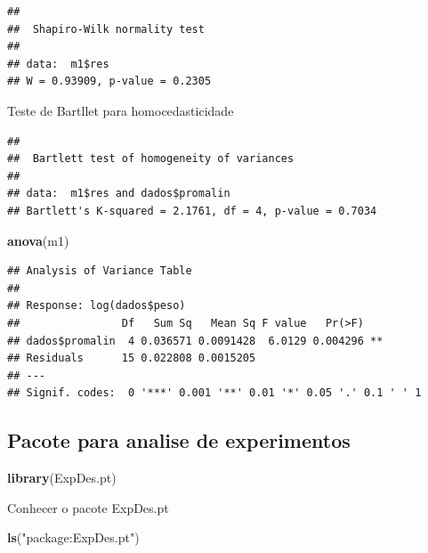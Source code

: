 \documentclass[
]{book}
\newenvironment{Shaded}{\begin{snugshade}}{\end{snugshade}}
\newcommand{\KeywordTok}[1]{\textcolor[rgb]{0.13,0.29,0.53}{\textbf{#1}}}
\newcommand{\NormalTok}[1]{#1}
\newcommand{\OperatorTok}[1]{\textcolor[rgb]{0.81,0.36,0.00}{\textbf{#1}}}
\newcommand{\StringTok}[1]{\textcolor[rgb]{0.31,0.60,0.02}{#1}}
\begin{document}
\begin{verbatim}
## 
##  Shapiro-Wilk normality test
## 
## data:  m1$res
## W = 0.93909, p-value = 0.2305
\end{verbatim}

Teste de Bartllet para homocedasticidade

\begin{Shaded}
\end{Shaded}

\begin{verbatim}
## 
##  Bartlett test of homogeneity of variances
## 
## data:  m1$res and dados$promalin
## Bartlett's K-squared = 2.1761, df = 4, p-value = 0.7034
\end{verbatim}

\begin{Shaded}
\begin{Highlighting}[]
\KeywordTok{anova}\NormalTok{(m1)}
\end{Highlighting}
\end{Shaded}

\begin{verbatim}
## Analysis of Variance Table
## 
## Response: log(dados$peso)
##                Df   Sum Sq   Mean Sq F value   Pr(>F)   
## dados$promalin  4 0.036571 0.0091428  6.0129 0.004296 **
## Residuals      15 0.022808 0.0015205                    
## ---
## Signif. codes:  0 '***' 0.001 '**' 0.01 '*' 0.05 '.' 0.1 ' ' 1
\end{verbatim}

\hypertarget{pacote-para-analise-de-experimentos}{%
\subsection{Pacote para analise de experimentos}\label{pacote-para-analise-de-experimentos}}

\begin{Shaded}
\begin{Highlighting}[]
\KeywordTok{library}\NormalTok{(ExpDes.pt)}
\end{Highlighting}
\end{Shaded}

Conhecer o pacote ExpDes.pt

\begin{Shaded}
\begin{Highlighting}[]
\KeywordTok{ls}\NormalTok{(}\StringTok{"package:ExpDes.pt"}\NormalTok{)}
\end{Highlighting}
\end{Shaded}
\end{document}
